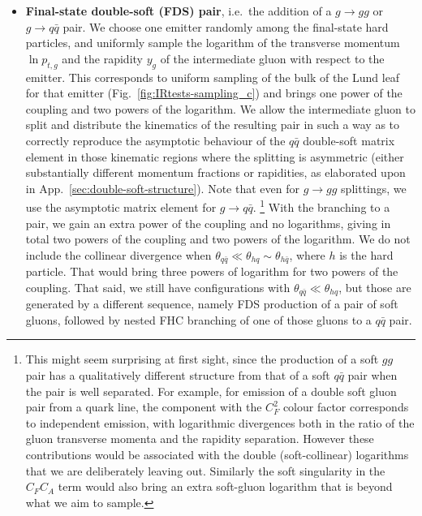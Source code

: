 \documentclass[nofootinbib,twocolumn,preprintnumbers,superscriptaddress,aps]{revtex4-2}
\begin{document}
\begin{itemize}
\item \textbf{Final-state double-soft (FDS) pair}, i.e.\ the addition of a
  $g \to gg$ or $g \to q\bar q$ pair.
  We choose one emitter randomly among the final-state hard particles,
  and uniformly sample the logarithm of the transverse momentum
  $\ln p_{t,g}$ and the rapidity $y_g$ of the intermediate gluon with
  respect to the emitter.
  This corresponds to uniform sampling of the bulk of the Lund leaf
  for that emitter (Fig.~\ref{fig:IRtests-sampling_c}) and brings
  one power of the coupling and two powers of the logarithm.
  We allow the intermediate gluon to split and distribute the
  kinematics of the resulting pair in such a way as to correctly
  reproduce the asymptotic behaviour of the $q\bar q$
  double-soft matrix element in those kinematic regions
  where the splitting is asymmetric (either substantially different
  momentum fractions or rapidities, as elaborated upon in
  App.~\ref{sec:double-soft-structure}).
  Note that even for $g \to gg$ splittings, we use the asymptotic matrix element for $g \to q\bar q$.%
   \footnote{This might seem surprising at
    first sight, since the production of a soft $gg$
    pair has a qualitatively different structure from that of a soft
    $q\bar q$ pair when the pair is well separated.
    For example, for emission of a double soft gluon pair from a quark line,
    the component with the $C_F^2$ colour factor corresponds to
    independent emission, with logarithmic divergences both in the
    ratio of the gluon transverse momenta and the rapidity
    separation.
    However these contributions would be associated with the double
    (soft-collinear) logarithms that we are deliberately leaving out.
    Similarly the soft singularity in the $C_F C_A$ term would also
    bring an extra soft-gluon logarithm that is beyond what we aim to
    sample.
    }
%
  With the branching to a pair, we gain an extra power of the coupling
  and no logarithms, giving in total two powers of the coupling and
  two powers of the logarithm.
  We do not include the collinear divergence when $\theta_{q\bar q}
  \ll \theta_{hq} \sim \theta_{h\bar q}$, where $h$ is the hard
  particle.
  That would bring three powers of logarithm for two powers of the
  coupling.
  That said, we still have configurations with
  $\theta_{q\bar q} \ll \theta_{hq}$, but those are generated by a different sequence, namely FDS production of a pair
  of soft gluons, followed by nested FHC branching of one of those
  gluons to a $q\bar q$ pair.


\end{itemize}
\end{document}
